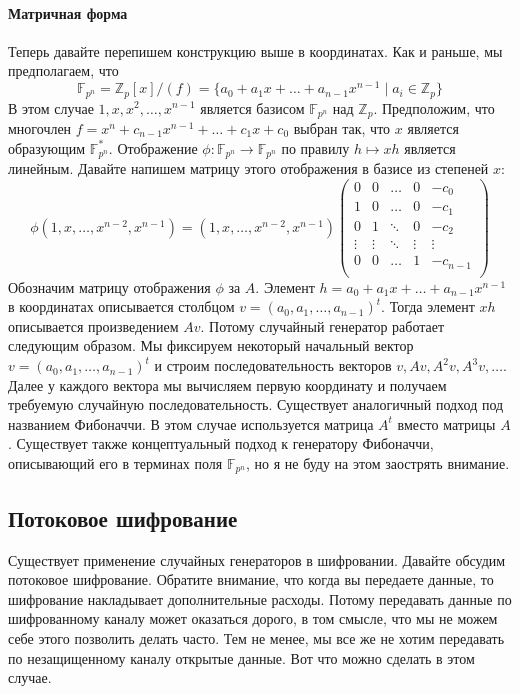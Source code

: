 \paragraph{Матричная форма}

Теперь давайте перепишем конструкцию выше в координатах.
Как и раньше, мы предполагаем, что
\[
\mathbb F_{p^n} = \mathbb Z_p[x]/(f)= \{a_0 + a_1 x + \ldots + a_{n-1}x^{n-1}\mid a_i\in \mathbb Z_p\}
\]
В этом случае $1, x, x^2,\ldots,x^{n-1}$ является базисом $\mathbb F_{p^n}$ над $\mathbb Z_p$.
Предположим, что многочлен $f = x^n + c_{n-1}x^{n-1} +\ldots + c_1 x + c_0$ выбран так, что $x$ является образующим $\mathbb F_{p^n}^*$.
Отображение $\phi \colon \mathbb F_{p^n}\to \mathbb F_{p^n}$ по правилу $h \mapsto xh$ является линейным.
Давайте напишем матрицу этого отображения в базисе из степеней $x$:
\[
\phi(1, x,\ldots, x^{n-2}, x^{n-1}) = (1, x,\ldots, x^{n-2}, x^{n-1})
\begin{pmatrix}
{0}&{0}&{\ldots}&{0}&{-c_0}\\
{1}&{0}&{\ldots}&{0}&{-c_1}\\
{0}&{1}&{\ddots}&{0}&{-c_2}\\
{\vdots}&{\vdots}&{\ddots}&{\vdots}&{\vdots}\\
{0}&{0}&{\ldots}&{1}&{-c_{n-1}}\\
\end{pmatrix}
\]
Обозначим матрицу отображения $\phi$ за $A$.
Элемент $h= a_0 + a_1 x + \ldots + a_{n-1}x^{n-1}$ в координатах описывается столбцом $v = (a_0,a_1,\ldots,a_{n-1})^t$.
Тогда элемент $xh$ описывается произведением $Av$.
Потому случайный генератор работает следующим образом.
Мы фиксируем некоторый начальный вектор $v = (a_0,a_1,\ldots,a_{n-1})^t$ и строим последовательность векторов $v, Av, A^2v, A^3v, \ldots$.
Далее у каждого вектора мы вычисляем первую координату и получаем требуемую случайную последовательность.
Существует аналогичный подход под названием Фибоначчи.
В этом случае используется матрица $A^t$ вместо матрицы $A$.
Существует также концептуальный подход к генератору Фибоначчи, описывающий его в терминах поля $\mathbb F_{p^n}$, но я не буду на этом заострять внимание.

\subsection{Потоковое шифрование}

Существует применение случайных генераторов в шифровании.
Давайте обсудим потоковое шифрование.
Обратите внимание, что когда вы передаете данные, то шифрование накладывает дополнительные расходы.
Потому передавать данные по шифрованному каналу может оказаться дорого, в том смысле, что мы не можем себе этого позволить делать часто.
Тем не менее, мы все же не хотим передавать по незащищенному каналу открытые данные.
Вот что можно сделать в этом случае.

